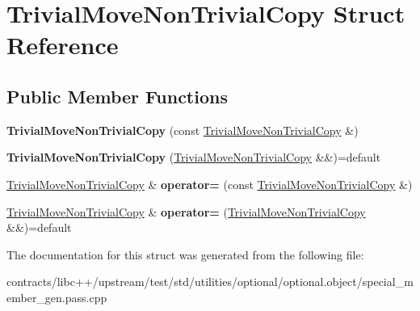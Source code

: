 \hypertarget{struct_trivial_move_non_trivial_copy}{}\section{Trivial\+Move\+Non\+Trivial\+Copy Struct Reference}
\label{struct_trivial_move_non_trivial_copy}
\subsection*{Public Member Functions}
\begin{DoxyCompactItemize}
\item 
\mbox{\label{struct_trivial_move_non_trivial_copy_aa2554f8d684beb400b6640a6f6c271ae}} 
{\bfseries Trivial\+Move\+Non\+Trivial\+Copy} (const \mbox{\hyperlink{struct_trivial_move_non_trivial_copy}{Trivial\+Move\+Non\+Trivial\+Copy}} \&)
\item 
\mbox{\label{struct_trivial_move_non_trivial_copy_a684a2eb8515dacac53b604a9264fec34}} 
{\bfseries Trivial\+Move\+Non\+Trivial\+Copy} (\mbox{\hyperlink{struct_trivial_move_non_trivial_copy}{Trivial\+Move\+Non\+Trivial\+Copy}} \&\&)=default
\item 
\mbox{\label{struct_trivial_move_non_trivial_copy_acfef2f0b7ddb10720278f1b66c9909a8}} 
\mbox{\hyperlink{struct_trivial_move_non_trivial_copy}{Trivial\+Move\+Non\+Trivial\+Copy}} \& {\bfseries operator=} (const \mbox{\hyperlink{struct_trivial_move_non_trivial_copy}{Trivial\+Move\+Non\+Trivial\+Copy}} \&)
\item 
\mbox{\label{struct_trivial_move_non_trivial_copy_a3876ad99b68492261c2b9cede89b59f5}} 
\mbox{\hyperlink{struct_trivial_move_non_trivial_copy}{Trivial\+Move\+Non\+Trivial\+Copy}} \& {\bfseries operator=} (\mbox{\hyperlink{struct_trivial_move_non_trivial_copy}{Trivial\+Move\+Non\+Trivial\+Copy}} \&\&)=default
\end{DoxyCompactItemize}


The documentation for this struct was generated from the following file\+:\begin{DoxyCompactItemize}
\item 
contracts/libc++/upstream/test/std/utilities/optional/optional.\+object/special\+\_\+member\+\_\+gen.\+pass.\+cpp\end{DoxyCompactItemize}
